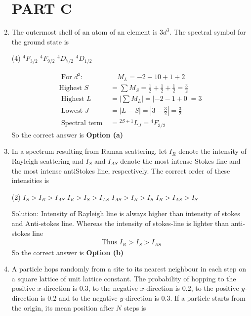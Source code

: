 \begin{enumerate}
\section{PART C}
\item The outermost shell of an atom of an element is $3 d^{3}$. The spectral symbol for the ground state is
 \begin{tasks}(4)
	\task[\textbf{a.}] ${ }^{4} F_{3 / 2}$
	\task[\textbf{b.}]${ }^{4} F_{9 / 2}$
	\task[\textbf{c.}]${ }^{4} D_{7 / 2}$
	\task[\textbf{d.}] ${ }^{4} D_{1 / 2}$
\end{tasks}
\begin{answer}
	\begin{align*}
	\text { For } d^{3}: &\quad M_{L}=-2-10+1+2\\
	\text{Highest }S&=\sum M_{S}=\frac{1}{2}+\frac{1}{2}+\frac{1}{2}=\frac{3}{2}\\
\text{	Highest }L&=\left|\sum M_{L}\right|=|-2-1+0|=3\\
\text{	Lowest }J&=|L-S|=\left|3-\frac{3}{2}\right|=\frac{3}{2}\\
\text{	Spectral term }&={ }^{2 S+1} L_{J}={ }^{4} F_{3 / 2}
	\end{align*}
		So the correct answer is \textbf{Option (a)}
\end{answer}
\item In a spectrum resulting from Raman scattering, let $I_{R}$ denote the intensity of Rayleigh scattering and $I_{S}$ and $I_{A S}$ denote the most intense Stokes line and the most intense antiStokes line, respectively. The correct order of these intensities is
 \begin{tasks}(2)
	\task[\textbf{a.}] $I_{S}>I_{R}>I_{A S}$
	\task[\textbf{b.}]$I_{R}>I_{S}>I_{A S}$
	\task[\textbf{c.}]$I_{A S}>I_{R}>I_{S}$
	\task[\textbf{d.}]$I_{R}>I_{A S}>I_{S}$ 
\end{tasks}
\begin{answer}
	Solution: Intensity of Rayleigh line is always higher than intensity of stokes and Anti-stokes line.
	Whereas the intensity of stokes-line is lighter than anti-stokes line
	\begin{align*}
	\text { Thus } I_{R}>I_{S}>I_{A S}
	\end{align*}
	So the correct answer is \textbf{Option (b)}
\end{answer}
\item A particle hops randomly from a site to its nearest neighbour in each step on a square lattice of unit lattice constant. The probability of hopping to the positive $x$-direction is $0.3$, to the negative $x$-direction is $0.2$, to the positive $y$-direction is $0.2$ and to the negative $y$-direction is $0.3$. If a particle starts from the origin, its mean position after $N$ steps is

\end{enumerate}

